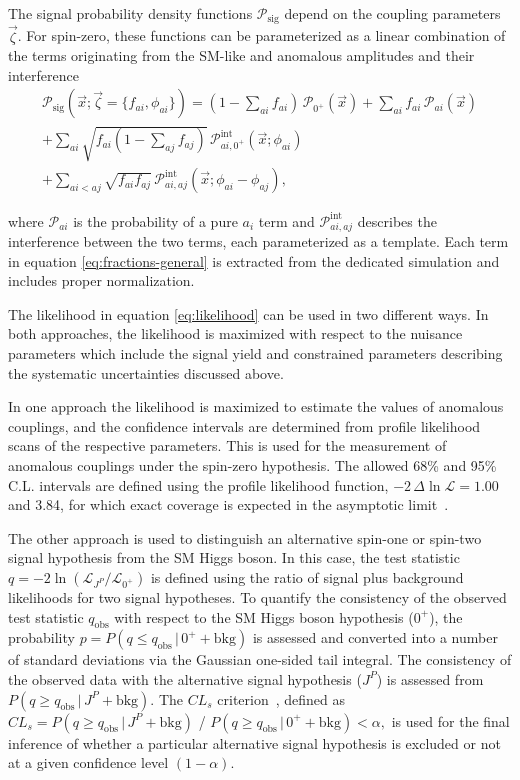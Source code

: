 The signal probability density functions $\mathcal{P}_\text{sig}$ depend on the coupling parameters $\vec{\zeta}$.
For spin-zero, these functions can be parameterized as a linear combination of the terms originating from
the SM-like and anomalous amplitudes and their interference~\cite{Anderson:2013afp}
\begin{multline}
\mathcal{P}_\text{sig}\left(\vec{x}; \vec{\zeta}=\{f_{ai},\phi_{ai}\}\right) =  \left(1-\sum_{ai} f_{ai}\right) \, \mathcal{P}_{0^+}\left(\vec{x}\right)
 + \sum_{ai} f_{ai} \, \mathcal{P}_{ai}\left(\vec{x}\right)  \\
+ \sum_{ai} \sqrt{f_{ai}\left(1-\sum_{aj} f_{aj}\right)}\, \mathcal{P}^\text{int}_{ai,0^+}\left(\vec{x}; \phi_{ai}\right) \\
+ \sum_{ai<aj} \sqrt{f_{ai}f_{aj}} \, \mathcal{P}^\text{int}_{ai,aj}\left(\vec{x}; \phi_{ai}-\phi_{aj}\right),
\label{eq:fractions-general}
\end{multline}

where $\mathcal{P}_{ai}$ is the probability of a pure $a_i$ term and $\mathcal{P}^\text{int}_{ai, aj}$ describes
the interference between the two terms, each parameterized as a template.
Each term in equation \eqref{eq:fractions-general} is extracted from the dedicated simulation
and includes proper normalization.

The likelihood in equation \eqref{eq:likelihood} can be used in two different ways.
In both approaches, the likelihood is maximized with respect to the nuisance parameters which include the signal yield
and constrained parameters describing the systematic uncertainties discussed above.

In one approach the likelihood is maximized to estimate the values of anomalous couplings, and the confidence intervals are determined from profile likelihood scans of the respective parameters. This is used for the measurement of anomalous
couplings under the spin-zero hypothesis. The allowed 68\% and 95\% C.L. intervals are defined using the profile likelihood function, $-2\,\Delta \ln{\mathcal L} = 1.00$ and 3.84, for which exact coverage is expected in the asymptotic limit~\cite{Wilks:1938dza}.

The other approach is used to distinguish an alternative spin-one or spin-two signal hypothesis from the SM Higgs boson.
In this case, the test statistic $q=-2{\ln(\mathcal{L}_{J^P}/\mathcal{L}_{0^+})}$ is defined using the ratio
of signal plus background likelihoods for two signal hypotheses. To quantify the consistency of the observed test statistic
$q_\text{obs}$ with respect to the SM Higgs boson hypothesis ($0^+$), the probability $p = P( q \leq q_\text{obs} \, | \, 0^+ +\text{bkg} )$ is assessed and converted into a number of standard deviations via the Gaussian one-sided tail integral.
The consistency of the observed data with the alternative signal hypothesis ($J^P$) is assessed from
$P( q \geq q_\text{obs} \, | \, J^P + \text{bkg} )$. The $CL_{s}$ criterion~\cite{Read:2002hq,Junk:1999kv}, defined
as $CL_{s} = { P( q \geq q_\text{obs} \, | \, J^P + \text{bkg} ) }$ / ${ P( q \geq q_\text{obs} \, | \, 0^+ + \text{bkg} ) } < \alpha,$
is used for the final inference of whether a particular alternative signal hypothesis is excluded or not at a given confidence level $(1 -\alpha)$.

